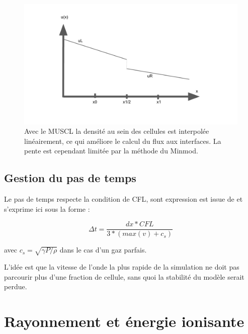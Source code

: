 \begin{figure}
        \includegraphics[width=.95\linewidth]{img/02/MUSCL_minmod.pdf} 
        \caption[Méthode MUSCL]{Avec le \ac{MUSCL} la densité au sein des cellules est interpolée linéairement, ce qui améliore le calcul du flux aux interfaces.
        La pente est cependant limitée par la méthode du Minmod.
 		\label{fig:MUSCL}
 		}
\end{figure}



\subsection{Gestion du pas de temps}
\label{sec:dthydro}

Le pas de temps respecte la condition de \ac{CFL}, sont expression est issue de \cite{teyssier_cosmological_2002} et s'exprime ici sous la forme :

\begin{equation}
\Delta t = \frac{dx * CFL }{3*(max(v) + c_s)}
\end{equation}

avec $c_s = \sqrt{\gamma P/\rho}$ dans le cas d'un gaz parfais.

L'idée est que la vitesse de l'onde la plus rapide de la simulation ne doit pas parcourir plus d'une fraction de cellule, sans quoi la stabilité du modèle serait perdue.


\clearpage
\section{Rayonnement et énergie ionisante}
\label{sec:rad_solver}


